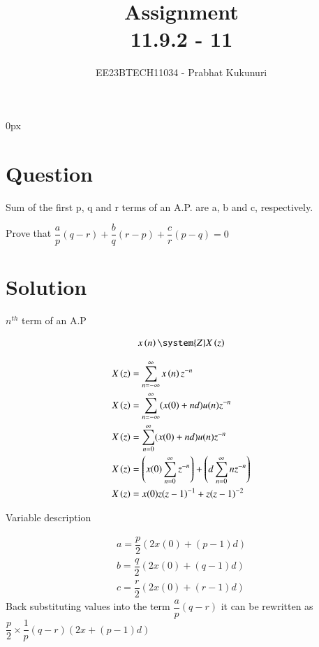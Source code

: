 \documentclass[journal,12pt,twocolumn]{IEEEtran}
\theoremstyle{remark}
\begin{document}
\parindent 0px


\vspace{3cm}

\title{Assignment\\[1ex]11.9.2 - 11}
\author{EE23BTECH11034 - Prabhat Kukunuri$^{}$%
}
\maketitle
\newpage
\bigskip

\renewcommand{\thefigure}{\theenumi}
\renewcommand{\thetable}{\theenumi}
\section*{Question}
Sum of the first p, q and r terms of an A.P. are a, b and c, respectively.

Prove that $\dfrac{a}{p}(q-r)+\dfrac{b}{q}(r-p)+\dfrac{c}{r}(p-q)=0$
\section*{Solution}
\begin{table}[h]
\centering

\caption{$n^{th}$ term of an A.P}
\end{table}
\begin{align}
	x \brak{n} \system{Z} X \brak{z} 
\end{align}

\begin{align}
    X \left(z\right) & = \sum_{n=-\infty}^{\infty} x \left(n\right)   z^{-n}\\
    X \left(z\right) & = \sum_{n=-\infty}^{\infty}(x(0)+nd)u(n)z^{-n}\\
    X \left(z\right) & = \sum_{n=0}^{\infty}(x(0)+nd)u(n)z^{-n}\\
    X \left(z\right) & = \left(x(0)\sum_{n=0}^{\infty}z^{-n}\right)+\left(d\sum_{n=0}^{\infty}nz^{-n}\right)\\
    X \left(z\right) & = x(0)z(z-1)^{-1} + z(z-1)^{-2}
\end{align}
\begin{table}[h]
    \centering
    
    \caption{Variable description}
    \label{11.9.2.11.2}
\end{table}
\begin{align}
    a=\dfrac{p}{2}(2x(0)+(p-1)d)\\
    b=\dfrac{q}{2}(2x(0)+(q-1)d)\\
    c=\dfrac{r}{2}(2x(0)+(r-1)d)
\end{align}
Back substituting values into the term $\dfrac{a}{p}(q-r)$ it can be rewritten as $\dfrac{p}{2} \times \dfrac{1}{p}(q-r)(2x+(p-1)d)$
\end{document}
